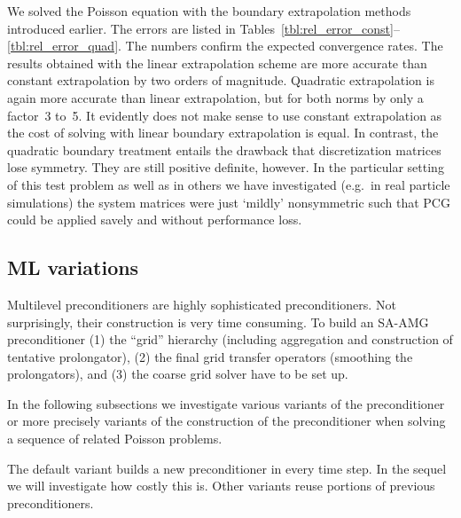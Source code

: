 We solved the Poisson equation with the boundary extrapolation methods
introduced earlier.  The errors are listed in
Tables~\ref{tbl:rel_error_const}--\ref{tbl:rel_error_quad}.  The numbers
confirm the expected convergence rates.  The results obtained with the
linear extrapolation scheme are more accurate than constant
extrapolation by two orders of magnitude.  Quadratic extrapolation is
again more accurate than linear extrapolation, but for both norms by
only a factor~3 to~5.  It evidently does not make sense to use constant
extrapolation as the cost of solving with linear boundary extrapolation
is equal.  In contrast, the quadratic boundary treatment entails the
drawback that discretization matrices lose symmetry.  They are still
positive definite, however.  In the particular setting of this test
problem as well as in others we have investigated (e.g.\ in real
particle simulations) the system matrices were just `mildly'
nonsymmetric such that PCG could be applied savely and without
performance loss.



\subsection{ML variations}\label{sec:ml_var}

Multilevel preconditioners are highly sophisticated preconditioners.
Not surprisingly, their construction is very time consuming.  To build
an SA-AMG preconditioner (1) the ``grid'' hierarchy (including
aggregation and construction of tentative prolongator), (2) the final
grid transfer operators (smoothing the prolongators), and (3) the coarse
grid solver have to be set up.

In the following subsections we investigate various variants of the
preconditioner or more precisely variants of the construction of the
preconditioner when solving a sequence of related Poisson problems.

The default variant builds a new preconditioner in every time step.  In
the sequel we will investigate how costly this is.  Other variants reuse
portions of previous preconditioners.


